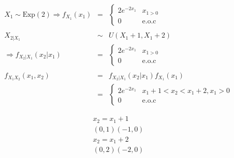 \begin{enumerate}
\begin{eqnarray*}
X_{1} \sim \textrm{Exp} \left(2 \right)\Rightarrow f_{X_1} \left(x_{1} \right) &=& \begin{cases}
2e^{-2x_{1}}  & x_{1 > 0} \\
0 &  \textrm{e.o.c} 
\end{cases} \\\\
X_{2|X_{1}}&\sim & U \left(X_{1}+1, X_{1}+2 \right) \\
\Rightarrow f_{X_{2}|X_{1}}\left( x_{2}| x_{1}\right) &=& \begin{cases}
2e^{-2x_{1}}  & x_{1 > 0} \\
0 &  \textrm{e.o.c} 
\end{cases}\\\\
f_{X_{1}X_{2}}\left(x_{1},x_{2} \right) &=& f_{X_{2}| X_{1}} \left(x_{2} | x_{1} \right) f_{X_{1}}\left(x_{1} \right)\\
&=& \begin{cases}
2e^{-2x_{1}}  & x_{1}+1 < x_{2} < x_{1}+2, x_1>0 \\
0 &  \textrm{e.o.c} 
\end{cases}
\end{eqnarray*}

\begin{eqnarray*}
x_{2}=x_{1}+ 1\\
\left(0,1 \right)\left(-1,0 \right)\\
x_{2}=x_{1}+ 2\\
\left(0,2 \right)\left(-2,0 \right)
\end{eqnarray*}


\end{enumerate}
